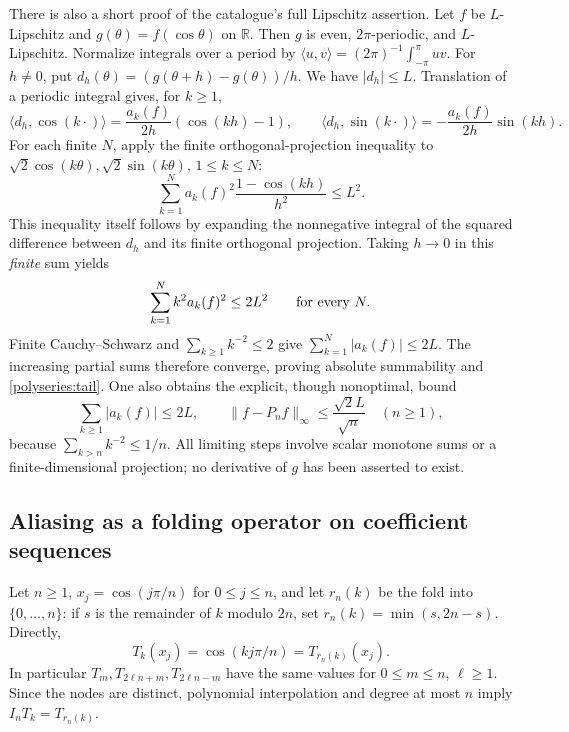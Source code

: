 \documentclass[11pt]{article}
\newcommand{\R}{\mathbb R}
\theoremstyle{remark}
\numberwithin{equation}{section}
\begin{document}
There is also a short proof of the catalogue's full Lipschitz assertion.
Let $f$ be $L$-Lipschitz and $g(\theta)=f(\cos\theta)$ on $\R$.
Then $g$ is even, $2\pi$-periodic, and $L$-Lipschitz. Normalize integrals
over a period by $\langle u,v\rangle=(2\pi)^{-1}\int_{-\pi}^\pi uv$.
For $h\ne0$, put $d_h(\theta)=(g(\theta+h)-g(\theta))/h$.
We have $|d_h|\le L$. Translation of a periodic integral gives, for $k\ge1$,
\[
 \langle d_h,\cos(k\cdot)\rangle
    =\frac{a_k(f)}{2h}(\cos(kh)-1),\qquad
 \langle d_h,\sin(k\cdot)\rangle
    =-\frac{a_k(f)}{2h}\sin(kh).
\]
For each finite $N$, apply the finite orthogonal-projection inequality to
$\sqrt2\cos(k\theta),\sqrt2\sin(k\theta)$, $1\le k\le N$:
\begin{equation}\label{polyseries:finitebessel}
 \sum_{k=1}^N a_k(f)^2\frac{1-\cos(kh)}{h^2}\le L^2.
\end{equation}
This inequality itself follows by expanding the nonnegative integral of
the squared difference between $d_h$ and its finite orthogonal projection.
Taking $h\to0$ in this \emph{finite} sum yields
\begin{equation}\label{polyseries:lipschitzenergy}
 \sum_{k=1}^N k^2a_k(f)^2\le2L^2\qquad\hbox{for every }N.
\end{equation}
Finite Cauchy--Schwarz and $\sum_{k\ge1}k^{-2}\le2$ give
$\sum_{k=1}^N|a_k(f)|\le2L$. The increasing partial sums therefore
converge, proving absolute summability and \eqref{polyseries:tail}.
One also obtains the explicit, though nonoptimal, bound
\[
 \sum_{k\ge1}|a_k(f)|\le2L,\qquad
 \|f-P_nf\|_\infty\le\frac{\sqrt2 L}{\sqrt n}\quad(n\ge1),
\]
because $\sum_{k>n}k^{-2}\le1/n$. All limiting steps involve scalar
monotone sums or a finite-dimensional projection; no derivative of $g$
has been asserted to exist.

\subsection{Aliasing as a folding operator on coefficient sequences}
\label{polyseries:aliasing}
Let $n\ge1$, $x_j=\cos(j\pi/n)$ for $0\le j\le n$, and let $r_n(k)$
be the fold into $\{0,\ldots,n\}$: if $s$ is the remainder of $k$ modulo
$2n$, set $r_n(k)=\min(s,2n-s)$. Directly,
\begin{equation}\label{polyseries:alias}
 T_k(x_j)=\cos(kj\pi/n)=T_{r_n(k)}(x_j).
\end{equation}
In particular $T_m,T_{2\ell n+m},T_{2\ell n-m}$ have the same values
for $0\le m\le n$, $\ell\ge1$. Since the nodes are distinct, polynomial
interpolation and degree at most $n$ imply $I_nT_k=T_{r_n(k)}$.
\end{document}
